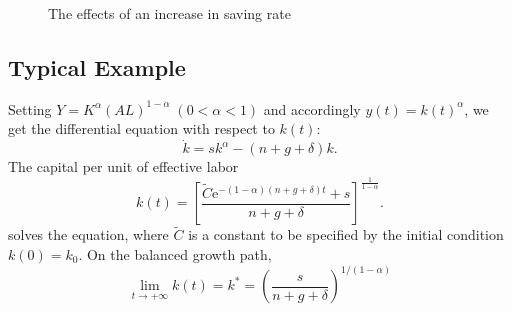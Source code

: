 \documentclass[12pt]{article} %
\newcommand{\e}{\mathrm{e}}
\begin{document}
\begin{figure}[H] %
	\caption{\small The effects of an increase in saving rate}
	\label{fig:speciation}
\end{figure}


\subsection{Typical Example}

Setting $Y=K^\alpha (AL)^{1-\alpha}\;(0<\alpha<1)$ and accordingly $y(t)=k(t)^\alpha$, we get the differential equation with respect to $k(t)$:
\[
\dot{k}=sk^\alpha-(n+g+\delta)k.
\]
The capital per unit of effective labor 
\[
k(t)=\left[\dfrac{\widetilde{C}\e^{-(1-\alpha)(n+g+\delta)t}+s}{n+g+\delta}\right]^{\tfrac{1}{1-\alpha}}.
\]
solves the equation, where $\widetilde{C}$ is a constant to be specified by the initial condition $k(0)=k_0$. On the balanced growth path, 
\[
\lim\limits_{t\rightarrow+\infty}k(t)=k^*=\left(\dfrac{s}{n+g+\delta}\right)^{1/(1-\alpha)}
\]
\end{document}
